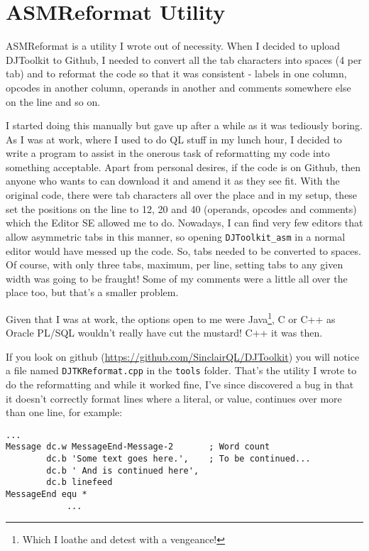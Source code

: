 \chapter{ASMReformat Utility}

ASMReformat is a utility I wrote out of necessity. When I decided to upload DJToolkit to Github, I needed to convert all the tab characters into spaces (4 per tab) and to reformat the code so that it was consistent - labels in one column, opcodes in another column, operands in another and comments somewhere else on the line and so on.

I started doing this manually but gave up after a while as it was tediously boring. As I was at work, where I used to do QL stuff in my lunch hour, I decided to write a program to assist in the onerous task of reformatting my code into something acceptable. Apart from personal desires, if the code is on Github, then anyone who wants to can download it and amend it as they see fit. With the original code, there were tab characters all over the place and in my setup, these set the positions on the line to 12, 20 and 40 (operands, opcodes and comments) which the Editor SE allowed me to do. Nowadays, I can find very few editors that allow asymmetric tabs in this manner, so opening \texttt{DJToolkit\_asm} in a normal editor would have messed up the code. So, tabs needed to be converted to spaces. Of course, with only three tabs, maximum, per line, setting tabs to any given width was going to be fraught! Some of my comments were a little all over the place too, but that's a smaller problem.

Given that I was at work, the options open to me were Java\footnote{Which I loathe and detest with a vengeance!}, C or C++ as Oracle PL/SQL wouldn't really have cut the mustard! C++ it was then.

If you look on github (\url{https://github.com/SinclairQL/DJToolkit}) you will notice a file named \texttt{DJTKReformat.cpp} in the \texttt{tools} folder. That's the utility I wrote to do the reformatting and while it worked fine, I've since discovered a bug in that it doesn't correctly format lines where a literal, or value, continues over more than  one line, for example:

\begin{lstlisting}[firstnumber=1,caption={Continuation of Operands}]
			...
Message dc.w MessageEnd-Message-2       ; Word count
        dc.b 'Some text goes here.',    ; To be continued...
        dc.b ' And is continued here',
        dc.b linefeed
MessageEnd equ *
			...	
\end{lstlisting}

